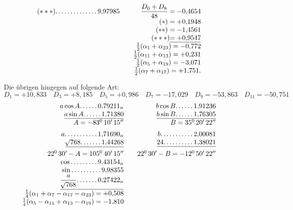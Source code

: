\begin{landscape}
\[\begin{array}{@{}r@{\qquad}r@{\qquad}r@{}}
\begin{array}[t]{@{}r@{}}
(***)\VfourDots{13}9{,}97985
\end{array}
&\begin{array}[t]{@{}r@{}}
\dfrac{D_0+D_8}{48}=-0{,}4654\\
(*)=+0{,}1948\\
(**)=-1{,}4561\\
(***)\underline{=+0{,}9547}\\
\tfrac12(\alpha_1+\alpha_{23})=-0{,}772\\
\tfrac12(\alpha_{11}+\alpha_{13})=+0{,}231\\
\tfrac12(\alpha_5+\alpha_{19})=-3{,}071\\
\tfrac12(\alpha_7+\alpha_{17})=+1{,}751.
\end{array}
\end{array}
\]
\par\noindent\hspace*{\parindent}Die übrigen hingegen auf folgende Art:
\[D_1=+10{,}833\quad D_3=+8{,}185\quad D_5=+0{,}986\quad D_7=-17{,}029\quad D_9=-53{,}863\quad D_{11}=-50{,}751\]
\[
\begin{array}{@{}r@{\qquad}r@{\qquad}r@{}}
\begin{array}[t]{@{}r@{}}
a\cos A\VfourDots{5}0{,}79211_n\\
\underline{a\sin A\VfourDots{5}1{,}71380}\\
A=-83^0\,10'\,15''\\[5pt]
a\VfourDots{10}1{,}71690_n\\
\underline{\BareRoot{768}\VfourDots{6}1{,}44268}\\[5pt]
22^0\,30'-A=105^0\,40'\,15''\\
\cos\VfourDots{8}9{,}43154_n\\
\sin\VfourDots{9}9{,}98355\\
\underline{\dfrac{a}{\BareRoot{768}}\VfourDots{6}0{,}27422_n}\\[5pt]
\tfrac14(\alpha_1+\alpha_7-\alpha_{17}-\alpha_{23})=+0{,}508\\
\tfrac14(\alpha_5-\alpha_{11}+\alpha_{13}-\alpha_{19})=-1{,}810
\end{array}
&\begin{array}[t]{@{}r@{}}
b\cos B\VfourDots{5}1{,}91236\\
\underline{b\sin B\VfourDots{5}1{,}76305}\\
B=35^0\,20'\,22''\\[5pt]
b\VfourDots{10}2{,}00081\\
\underline{24\VfourDots{9}1{,}38021}\\[5pt]
22^0\,30'-B=-12^0\,50'\,22''\\

\end{array}
\end{array}\]
\end{landscape}
